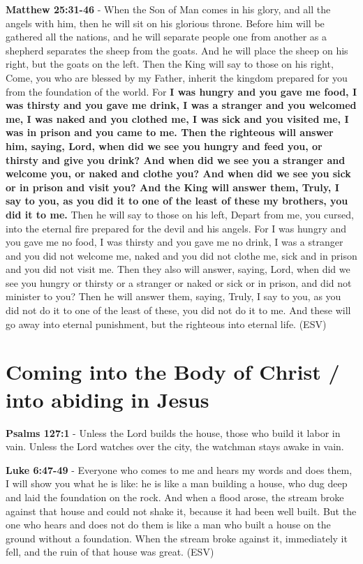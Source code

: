 \documentclass[11pt]{article}
\begin{document}
\textbf{Matthew 25:31-46} - When the Son of Man comes in his glory, and all the angels with him, then he will sit on his glorious throne. Before him will be gathered all the nations, and he will separate people one from another as a shepherd separates the sheep from the goats. And he will place the sheep on his right, but the goats on the left. Then the King will say to those on his right, Come, you who are blessed by my Father, inherit the kingdom prepared for you from the foundation of the world. For \textbf{I was hungry and you gave me food, I was thirsty and you gave me drink, I was a stranger and you welcomed me, I was naked and you clothed me, I was sick and you visited me, I was in prison and you came to me. Then the righteous will answer him, saying, Lord, when did we see you hungry and feed you, or thirsty and give you drink? And when did we see you a stranger and welcome you, or naked and clothe you? And when did we see you sick or in prison and visit you? And the King will answer them, Truly, I say to you, as you did it to one of the least of these my brothers, you did it to me.} Then he will say to those on his left, Depart from me, you cursed, into the eternal fire prepared for the devil and his angels. For I was hungry and you gave me no food, I was thirsty and you gave me no drink, I was a stranger and you did not welcome me, naked and you did not clothe me, sick and in prison and you did not visit me. Then they also will answer, saying, Lord, when did we see you hungry or thirsty or a stranger or naked or sick or in prison, and did not minister to you? Then he will answer them, saying, Truly, I say to you, as you did not do it to one of the least of these, you did not do it to me. And these will go away into eternal punishment, but the righteous into eternal life. (ESV)

\section{Coming into the Body of Christ / into abiding in Jesus}
\label{sec:org9e00cac}
\textbf{Psalms 127:1} - Unless the Lord builds the house, those who build it labor in vain. Unless the Lord watches over the city, the watchman stays awake in vain.

\textbf{Luke 6:47-49} - Everyone who comes to me and hears my words and does them, I will show you what he is like: he is like a man building a house, who dug deep and laid the foundation on the rock. And when a flood arose, the stream broke against that house and could not shake it, because it had been well built. But the one who hears and does not do them is like a man who built a house on the ground without a foundation. When the stream broke against it, immediately it fell, and the ruin of that house was great. (ESV)
\end{document}
